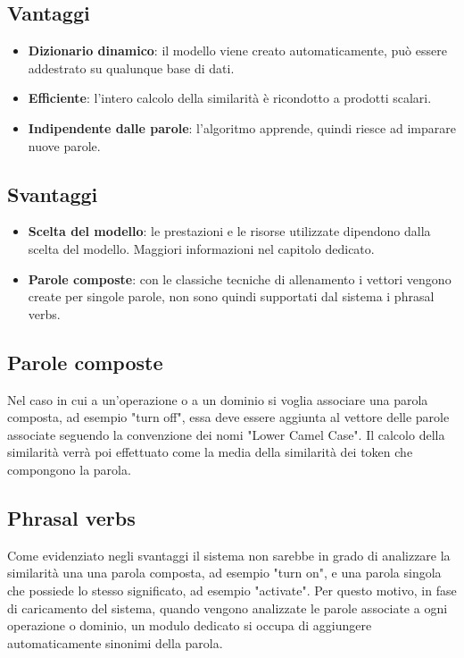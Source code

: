 \documentclass[twoside]{supsistudent}
\begin{document}
\subsection{Vantaggi}
\begin{itemize}
  \item \textbf{Dizionario dinamico}: il modello viene creato automaticamente, può essere addestrato su qualunque base di dati.
  \item \textbf{Efficiente}: l'intero calcolo della similarità è ricondotto a prodotti scalari.
    \item \textbf{Indipendente dalle parole}: l'algoritmo apprende, quindi riesce ad imparare nuove parole.
\end{itemize}
\subsection{Svantaggi}
\begin{itemize}
  \item \textbf{Scelta del modello}: le prestazioni e le risorse utilizzate dipendono dalla scelta del modello. Maggiori informazioni nel capitolo dedicato.
  \item \textbf{Parole composte}: con le classiche tecniche di allenamento i vettori vengono create per singole parole, non sono quindi supportati dal sistema i phrasal verbs.
\end{itemize}
\subsection{Parole composte}
Nel caso in cui a un'operazione o a un dominio si voglia associare una parola composta, ad esempio "turn off", essa deve essere aggiunta al vettore delle parole associate seguendo la convenzione dei nomi "Lower Camel Case". Il calcolo della similarità verrà poi effettuato come la media della similarità dei token che compongono la parola.\cite{lcc}
\subsection{Phrasal verbs}
Come evidenziato negli svantaggi il sistema non sarebbe in grado di analizzare la similarità una una parola composta, ad esempio "turn on", e una parola singola che possiede lo stesso significato, ad esempio "activate".
Per questo motivo, in fase di caricamento del sistema, quando vengono analizzate le parole associate a ogni operazione o dominio, un modulo dedicato si occupa di aggiungere automaticamente sinonimi della parola.
\end{document}
